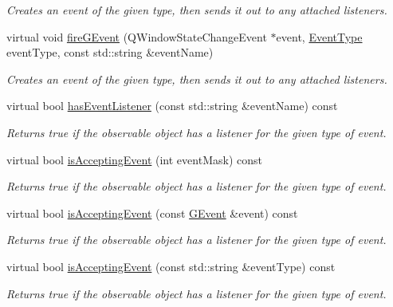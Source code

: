 \begin{DoxyCompactItemize}
\begin{DoxyCompactList}\small\item\em Creates an event of the given type, then sends it out to any attached listeners. \end{DoxyCompactList}\item 
virtual void \mbox{\hyperlink{classsgl_1_1GObservable_a2a70a7d7435ff0c3b80bb4d70da19e0d}{fire\+G\+Event}} (Q\+Window\+State\+Change\+Event $\ast$event, \mbox{\hyperlink{namespacesgl_a2628ea8d12e8b2563c32f05dc7fff6fa}{Event\+Type}} event\+Type, const std\+::string \&event\+Name)
\begin{DoxyCompactList}\small\item\em Creates an event of the given type, then sends it out to any attached listeners. \end{DoxyCompactList}\item 
virtual bool \mbox{\hyperlink{classsgl_1_1GObservable_a9f6faaa25942923bafa1c44020c49fa9}{has\+Event\+Listener}} (const std\+::string \&event\+Name) const
\begin{DoxyCompactList}\small\item\em Returns true if the observable object has a listener for the given type of event. \end{DoxyCompactList}\item 
virtual bool \mbox{\hyperlink{classsgl_1_1GObservable_aeec1adc19aa0f33de62390686ee1382c}{is\+Accepting\+Event}} (int event\+Mask) const
\begin{DoxyCompactList}\small\item\em Returns true if the observable object has a listener for the given type of event. \end{DoxyCompactList}\item 
virtual bool \mbox{\hyperlink{classsgl_1_1GObservable_aa31c73145a29dcb92848a92e0cfaea41}{is\+Accepting\+Event}} (const \mbox{\hyperlink{classsgl_1_1GEvent}{G\+Event}} \&event) const
\begin{DoxyCompactList}\small\item\em Returns true if the observable object has a listener for the given type of event. \end{DoxyCompactList}\item 
virtual bool \mbox{\hyperlink{classsgl_1_1GObservable_a3b1c689267eda44e65a2213e7de38b23}{is\+Accepting\+Event}} (const std\+::string \&event\+Type) const
\begin{DoxyCompactList}\small\item\em Returns true if the observable object has a listener for the given type of event. \end{DoxyCompactList}\item 

\end{DoxyCompactItemize}
